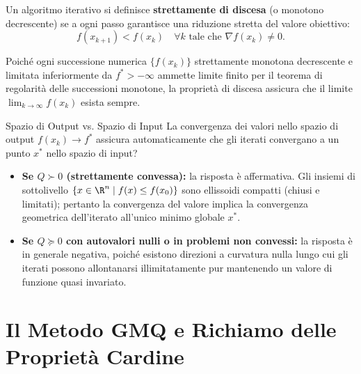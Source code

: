 \begin{definition}
Un algoritmo iterativo si definisce \textbf{strettamente di discesa} (o monotono decrescente) se a ogni passo garantisce una riduzione stretta del valore obiettivo:
\begin{equation}
    f(x_{k+1}) < f(x_k) \quad \forall k \text{ tale che } \nabla f(x_k) \neq 0.
\end{equation}
\end{definition}

\begin{proposition}
Poich\'e ogni successione numerica $\{f(x_k)\}$ strettamente monotona decrescente e limitata inferiormente da $f^* > -\infty$ ammette limite finito per il teorema di regolarit\`a delle successioni monotone, la propriet\`a di discesa assicura che il limite $\lim_{k \to \infty} f(x_k)$ esista sempre.
\end{proposition}

\begin{noteblock}{Spazio di Output vs. Spazio di Input}
La convergenza dei valori nello spazio di output $f(x_k) \to f^*$ assicura automaticamente che gli iterati convergano a un punto $x^*$ nello spazio di input?
\begin{itemize}
    \item \textbf{Se $Q \succ 0$ (strettamente convessa):} la risposta \`e affermativa. Gli insiemi di sottolivello $\{x \in \R^n \mid f(x) \le f(x_0)\}$ sono ellissoidi compatti (chiusi e limitati); pertanto la convergenza del valore implica la convergenza geometrica dell'iterato all'unico minimo globale $x^*$.
    \item \textbf{Se $Q \succeq 0$ con autovalori nulli o in problemi non convessi:} la risposta \`e in generale negativa, poich\'e esistono direzioni a curvatura nulla lungo cui gli iterati possono allontanarsi illimitatamente pur mantenendo un valore di funzione quasi invariato.
\end{itemize}
\end{noteblock}

\FloatBarrier
\section{Il Metodo GMQ e Richiamo delle Propriet\`a Cardine}
\label{sec:metodo-gradiente-passo-ottimo}

